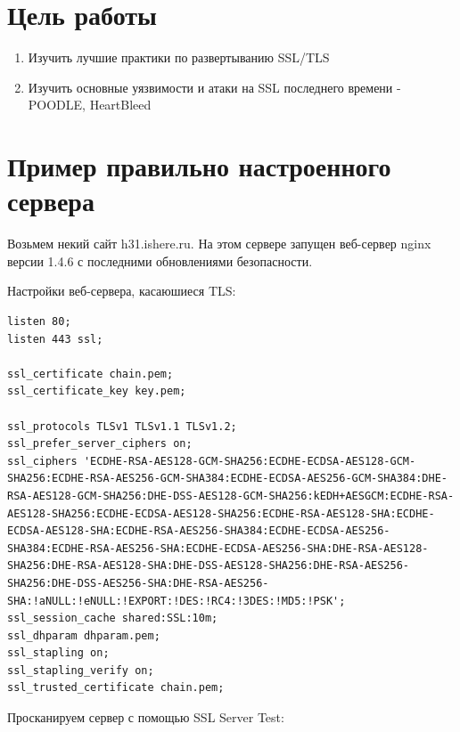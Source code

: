 \section{Цель работы}

\begin{enumerate}
	\item Изучить лучшие практики по развертыванию SSL/TLS
	\item Изучить основные уязвимости и атаки на SSL последнего времени - POODLE, HeartBleed
\end{enumerate}

\section{Пример правильно настроенного сервера}

Возьмем некий сайт h31.ishere.ru. На этом сервере запущен веб-сервер nginx версии 1.4.6 с последними обновлениями безопасности.

Настройки веб-сервера, касаюшиеся TLS:

\begin{lstlisting}
listen 80;
listen 443 ssl;

ssl_certificate chain.pem;
ssl_certificate_key key.pem;

ssl_protocols TLSv1 TLSv1.1 TLSv1.2;
ssl_prefer_server_ciphers on;
ssl_ciphers 'ECDHE-RSA-AES128-GCM-SHA256:ECDHE-ECDSA-AES128-GCM-SHA256:ECDHE-RSA-AES256-GCM-SHA384:ECDHE-ECDSA-AES256-GCM-SHA384:DHE-RSA-AES128-GCM-SHA256:DHE-DSS-AES128-GCM-SHA256:kEDH+AESGCM:ECDHE-RSA-AES128-SHA256:ECDHE-ECDSA-AES128-SHA256:ECDHE-RSA-AES128-SHA:ECDHE-ECDSA-AES128-SHA:ECDHE-RSA-AES256-SHA384:ECDHE-ECDSA-AES256-SHA384:ECDHE-RSA-AES256-SHA:ECDHE-ECDSA-AES256-SHA:DHE-RSA-AES128-SHA256:DHE-RSA-AES128-SHA:DHE-DSS-AES128-SHA256:DHE-RSA-AES256-SHA256:DHE-DSS-AES256-SHA:DHE-RSA-AES256-SHA:!aNULL:!eNULL:!EXPORT:!DES:!RC4:!3DES:!MD5:!PSK';
ssl_session_cache shared:SSL:10m;
ssl_dhparam dhparam.pem;
ssl_stapling on;
ssl_stapling_verify on;
ssl_trusted_certificate chain.pem;
\end{lstlisting}

Просканируем сервер с помощью SSL Server Test:

